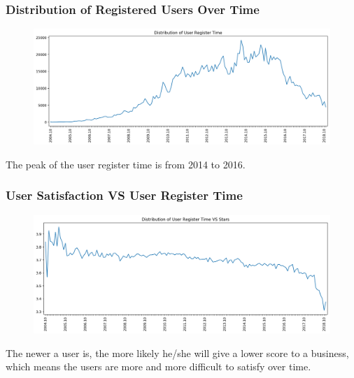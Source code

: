 \documentclass[12pt]{article}
\begin{document}
\subsubsection{Distribution of Registered Users Over Time}
\begin{figure}[H]
\begin{center}
    \includegraphics[width=1.0\textwidth]{../05_dataMining/distributionUserRegisterTime.png}
\end{center}
\end{figure}
The peak of the user register time is from 2014 to 2016.

\subsubsection{User Satisfaction VS User Register Time}
\begin{figure}[H]
\begin{center}
    \includegraphics[width=1.0\textwidth]{../05_dataMining/distributionUserRegisterTimeStars.png}
\end{center}
\end{figure}
The newer a user is, the more likely he/she will give a lower score to a business, which means the users are more and more difficult to satisfy over time.
\end{document}
